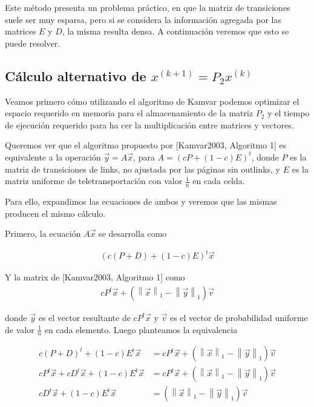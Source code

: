 Este método presenta un problema práctico, en que la matriz de transiciones suele ser muy
esparsa, pero si se considera la información agregada por las matrices $E$ y $D$, la misma
resulta densa. A continuación veremos que esto se puede resolver.

\subsection{Cálculo alternativo de $x^{(k + 1)} = P_2x^{(k)}$}

Veamos primero cómo utilizando el algoritmo de Kamvar podemos optimizar el espacio requerido
en memoria para el almacenamiento de la matriz $P_2$ y el tiempo de ejecución requerido para ha
cer la multiplicación entre matrices y vectores.

\newcommand{\vectornorm}[1]{\left\|#1\right\|}
Queremos ver que el algoritmo propuesto por [Kamvar2003, Algoritmo 1] es equivalente
a la operación $\vec{y} = A\vec{x}$, para $A=(cP + (1-c)E)^{t}$, donde $P$ es la matriz
de transiciones de links, no ajustada por las páginas sin outlinks,
y $E$ es la matriz uniforme de teletransportación con valor $\frac{1}{n}$ en cada celda.

Para ello, expandimos las ecuaciones de ambos y veremos que las mismas producen el mismo cálculo.

Primero, la ecuación $A\vec{x}$ se desarrolla como

\begin{align*}
(c(P + D) + (1 - c)E)^{t} \vec{x}
\end{align*}

Y la matrix de [Kamvar2003, Algoritmo 1] como
\begin{align*}
cP^{t}\vec{x} + (\vectornorm{\vec{x}}_1 - \vectornorm{\vec{y}}_1)\vec{v}
\end{align*}

donde $\vec{y}$ es el vector resultante de $cP^{t}\vec{x}$ y $\vec{v}$ es el vector de probabilidad
uniforme de valor $\frac{1}{n}$ en cada elemento. Luego planteamos la equivalencia

\begin{align*}
c(P + D)^{t} + (1-c)E^{t} \vec{x} &= cP^{t}\vec{x} + (\vectornorm{\vec{x}}_1 - \vectornorm{\vec{y}}_1)\vec{v} \\
cP^{t}\vec{x} + cD^{t}\vec{x} + (1-c)E^{t}\vec{x} &= cP^{t}\vec{x} + (\vectornorm{\vec{x}}_1 - \vectornorm{\vec{y}}_1)\vec{v} \\
cD^{t}\vec{x} + (1-c)E^{t}\vec{x} &= (\vectornorm{\vec{x}}_1 - \vectornorm{\vec{y}}_1)\vec{v}
\end{align*}

